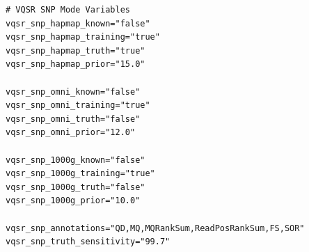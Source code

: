\begin{tcolorbox}[
    breakable,  %
    colback=white!0,  %
    colframe=black,  %
    boxrule=1pt,  %
    arc=1mm,  %
    outer arc=1mm,
     title=\textbf{\refstepcounter{myboxcounter}\label{box:qv_variables_example}Box \themyboxcounter: Example QV variables - extract from QV1 variables file}
]

\begin{verbatim}
# VQSR SNP Mode Variables
vqsr_snp_hapmap_known="false"
vqsr_snp_hapmap_training="true"
vqsr_snp_hapmap_truth="true"
vqsr_snp_hapmap_prior="15.0"

vqsr_snp_omni_known="false"
vqsr_snp_omni_training="true"
vqsr_snp_omni_truth="false"
vqsr_snp_omni_prior="12.0"

vqsr_snp_1000g_known="false"
vqsr_snp_1000g_training="true"
vqsr_snp_1000g_truth="false"
vqsr_snp_1000g_prior="10.0"

vqsr_snp_annotations="QD,MQ,MQRankSum,ReadPosRankSum,FS,SOR"
vqsr_snp_truth_sensitivity="99.7"

\end{verbatim}
\end{tcolorbox}

